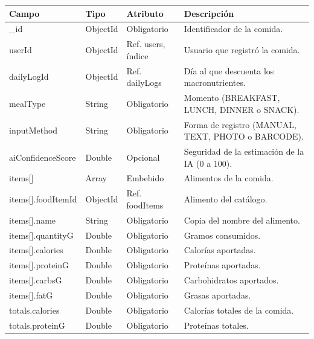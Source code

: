 {\footnotesize
\renewcommand{\arraystretch}{1.2}
\begin{longtable}{|>{\raggedright\arraybackslash}p{4.7cm}|>{\raggedright\arraybackslash}p{1.8cm}|>{\raggedright\arraybackslash}p{2.3cm}|>{\raggedright\arraybackslash}p{5.4cm}|}
    \hline
    \rowcolor[HTML]{EFEFEF}
    \textbf{Campo} & \textbf{Tipo} & \textbf{Atributo} & \textbf{Descripción} \\ \hline
    \endhead
    \_id & ObjectId & Obligatorio & Identificador de la comida. \\ \hline
    userId & ObjectId & Ref. users, índice & Usuario que registró la comida. \\ \hline
    dailyLogId & ObjectId & Ref. dailyLogs & Día al que descuenta los macronutrientes. \\ \hline
    mealType & String & Obligatorio & Momento (BREAKFAST, LUNCH, DINNER o SNACK). \\ \hline
    inputMethod & String & Obligatorio & Forma de registro (MANUAL, TEXT, PHOTO o BARCODE). \\ \hline
    aiConfidenceScore & Double & Opcional & Seguridad de la estimación de la IA (0 a 100). \\ \hline
    items[]\allowbreak  & Array & Embebido & Alimentos de la comida. \\ \hline
    items[]\allowbreak .\allowbreak foodItemId & ObjectId & Ref. foodItems & Alimento del catálogo. \\ \hline
    items[]\allowbreak .\allowbreak name & String & Obligatorio & Copia del nombre del alimento. \\ \hline
    items[]\allowbreak .\allowbreak quantityG & Double & Obligatorio & Gramos consumidos. \\ \hline
    items[]\allowbreak .\allowbreak calories & Double & Obligatorio & Calorías aportadas. \\ \hline
    items[]\allowbreak .\allowbreak proteinG & Double & Obligatorio & Proteínas aportadas. \\ \hline
    items[]\allowbreak .\allowbreak carbsG & Double & Obligatorio & Carbohidratos aportados. \\ \hline
    items[]\allowbreak .\allowbreak fatG & Double & Obligatorio & Grasas aportadas. \\ \hline
    totals.\allowbreak calories & Double & Obligatorio & Calorías totales de la comida. \\ \hline
    totals.\allowbreak proteinG & Double & Obligatorio & Proteínas totales. \\ \hline

\end{longtable}}
